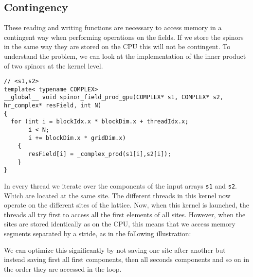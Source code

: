 \documentclass[12pt]{article}
\begin{document}
\subsection*{Contingency}
These reading and writing functions are necessary to access memory in a contingent way when performing operations on the fields. If we store the spinors in the same way they are stored on the CPU this will not be contingent. To understand the problem, we can look at the implementation of the inner product of two spinors at the kernel level.
\begin{lstlisting}[caption=Kernel implementation of spinor product]
// <s1,s2>
template< typename COMPLEX>
__global__ void spinor_field_prod_gpu(COMPLEX* s1, COMPLEX* s2, hr_complex* resField, int N)
{
  for (int i = blockIdx.x * blockDim.x + threadIdx.x;
       i < N;
       i += blockDim.x * gridDim.x)
    {
       resField[i] = _complex_prod(s1[i],s2[i]);
    }
}
\end{lstlisting}
In every thread we iterate over the components of the input arrays \texttt{s1} and \texttt{s2}. Which are located at the same site. The different threads in this kernel now operate on the different sites of the lattice. Now, when this kernel is launched, the threads all try first to access all the first elements of all sites. However, when the sites are stored identically as on the CPU, this means that we access memory segments separated by a stride, as in the following illustration:
\begin{figure}[H]
\centering
{}
\end{figure}
We can optimize this significantly by not saving one site after another but instead saving first all first components, then all seconds components and so on in the order they are accessed in the loop. 
\begin{figure}[H]
\centering
{}
\end{figure}
\end{document}
